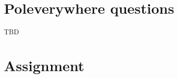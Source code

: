 \documentclass[a4paper,11pt]{article}
\begin{document}
\section{Poleverywhere questions}
\label{sec:polev-quest}


TBD


\section{Assignment}
\label{sec:assignment}

%





\end{document}

